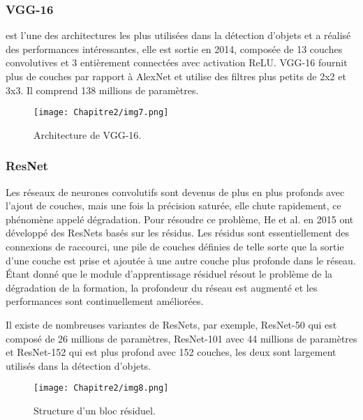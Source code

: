           \subsubsection{VGG-16} \cite{vgg_paper}
          est l'une des architectures les plus utilisées dans la détection d'objets et a 	réalisé des performances intéressantes, elle est sortie en 2014, composée de 13 couches convolutives et 3 entièrement connectées avec activation ReLU. VGG-16 fournit plus de couches par rapport à AlexNet et utilise des filtres plus petits de 2x2 et 3x3. Il comprend 138 millions de paramètres.
          \begin{figure}[H]
               \centering
               \texttt{[image: Chapitre2/img7.png]}
               \caption{Architecture de VGG-16.}
               \label{img7}
               \end{figure}

          \subsubsection{ResNet} \cite{resnet_paper}
          Les réseaux de neurones convolutifs sont devenus de plus en plus profonds avec l'ajout de couches, mais une fois la précision saturée, elle chute rapidement, ce phénomène appelé dégradation. Pour résoudre ce problème, He et al. en 2015 ont développé des ResNets basés sur les résidus. Les résidus sont essentiellement des connexions de raccourci, une pile de couches définies de telle sorte que la sortie d'une couche est prise et ajoutée à une autre couche plus profonde dans le réseau. Étant donné que le module d'apprentissage résiduel résout le problème de la dégradation de la formation, la profondeur du réseau est augmenté et les performances sont continuellement améliorées.

          Il existe de nombreuses variantes de ResNets, par exemple, ResNet-50 qui est composé de 26 millions de paramètres, ResNet-101 avec 44 millions de paramètres et ResNet-152 qui est plus profond avec 152 couches, les deux sont largement utilisés dans la détection d'objets.
          \begin{figure}[H]
               \centering
               \texttt{[image: Chapitre2/img8.png]}
               \caption{Structure d'un bloc résiduel.}
               \label{img8}
               \end{figure}
          
